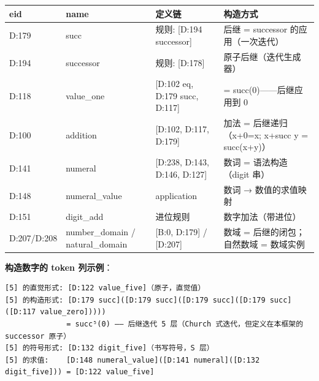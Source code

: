 \documentclass[
]{article}
\newcounter{none} %
\begin{document}
{\def\LTcaptype{none} %
\begin{longtable}[]{@{}
  >{\raggedright\arraybackslash}p{}
  >{\raggedright\arraybackslash}p{}
  >{\raggedright\arraybackslash}p{}
  >{\raggedright\arraybackslash}p{}@{}}
\toprule\noalign{}
\begin{minipage}[b]{\linewidth}\raggedright
eid
\end{minipage} & \begin{minipage}[b]{\linewidth}\raggedright
name
\end{minipage} & \begin{minipage}[b]{\linewidth}\raggedright
定义链
\end{minipage} & \begin{minipage}[b]{\linewidth}\raggedright
构造方式
\end{minipage} \\
\midrule\noalign{}
\endhead
\bottomrule\noalign{}
\endlastfoot
D:179 & succ & 规则: {[}D:194 successor{]} & 后继 = successor
的应用（一次迭代） \\
D:194 & successor & 规则: {[}D:178{]} & 原子后继（迭代生成器） \\
D:118 & value\_one & {[}D:102 eq, D:179 succ, D:117{]} & 1 =
succ(0)------后继应用到 0 \\
D:100 & addition & {[}D:102, D:117, D:179{]} & 加法 = 后继递归（x+0=x;
x+succ y = succ(x+y)） \\
D:141 & numeral & {[}D:238, D:143, D:146, D:127{]} & 数词 =
语法构造（digit 串） \\
D:148 & numeral\_value & application & 数词 → 数值的求值映射 \\
D:151 & digit\_add & 进位规则 & 数字加法（带进位） \\
D:207/D:208 & number\_domain / natural\_domain & {[}B:0, D:179{]} /
{[}D:207{]} & 数域 = 后继的闭包；自然数域 = 数域实例 \\
\end{longtable}
}

\textbf{构造数字的 token 列示例}：

\begin{verbatim}
[5] 的直觉形式: [D:122 value_five]（原子，直觉值）
[5] 的构造形式: [D:179 succ]([D:179 succ]([D:179 succ]([D:179 succ]([D:117 value_zero]))))
              = succ⁵(0) —— 后继迭代 5 层（Church 式迭代，但定义在本框架的 successor 原子）
[5] 的符号形式: [D:132 digit_five]（书写符号，S 层）
[5] 的求值:    [D:148 numeral_value]([D:141 numeral]([D:132 digit_five])) = [D:122 value_five]
\end{verbatim}
\end{document}
